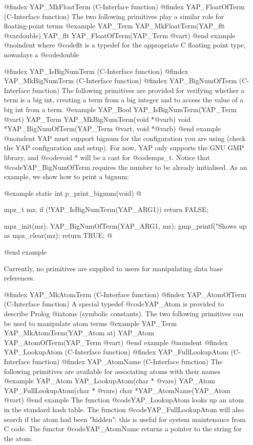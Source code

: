 {{{{{{{{@findex YAP_MkFloatTerm (C-Interface function)
@findex YAP_FloatOfTerm (C-Interface function)
The two following primitives play a similar role for floating-point terms
@example
      YAP_Term YAP_MkFloatTerm(YAP_flt @var{double})
      YAP_flt  YAP_FloatOfTerm(YAP_Term @var{t})
@end example
@noindent
where @code{flt} is a typedef for the appropriate C floating point type,
nowadays a @code{double}

@findex YAP_IsBigNumTerm (C-Interface function)
@findex YAP_MkBigNumTerm (C-Interface function)
@findex YAP_BigNumOfTerm (C-Interface function)
The following primitives are provided for verifying whether a term is
a big int, creating a term from a big integer and to access the value
of a big int from a term.
@example
      YAP_Bool YAP_IsBigNumTerm(YAP_Term @var{t})
      YAP_Term YAP_MkBigNumTerm(void  *@var{b})
      void *YAP_BigNumOfTerm(YAP_Term @var{t}, void *@var{b})
@end example
@noindent
YAP must support bignum for the configuration you are using (check the
YAP configuration and setup). For now, YAP only supports the GNU GMP
library, and @code{void *} will be a cast for @code{mpz_t}. Notice
that @code{YAP_BigNumOfTerm} requires the number to be already
initialised. As an example, we show how to print a bignum:

@example
static int
p_print_bignum(void)
@{
  mpz_t mz;
  if (!YAP_IsBigNumTerm(YAP_ARG1))
    return FALSE;

  mpz_init(mz);
  YAP_BigNumOfTerm(YAP_ARG1, mz);
  gmp_printf("Shows up as %
  mpz_clear(mz);
  return TRUE;
@}
@end example


Currently, no primitives are supplied to users for manipulating data base
references. 

@findex YAP_MkAtomTerm (C-Interface function)
@findex YAP_AtomOfTerm (C-Interface function)
A special typedef @code{YAP_Atom} is provided to describe Prolog
@i{atoms} (symbolic constants). The two following primitives can be used
to manipulate atom terms
@example
      YAP_Term YAP_MkAtomTerm(YAP_Atom at)
      YAP_Atom YAP_AtomOfTerm(YAP_Term @var{t})
@end example
@noindent
@findex YAP_LookupAtom (C-Interface function)
@findex YAP_FullLookupAtom (C-Interface function)
@findex YAP_AtomName (C-Interface function)
The following primitives are available for associating atoms with their
names 
@example
      YAP_Atom  YAP_LookupAtom(char * @var{s})
      YAP_Atom  YAP_FullLookupAtom(char * @var{s})
      char     *YAP_AtomName(YAP_Atom @var{t})
@end example
The function @code{YAP_LookupAtom} looks up an atom in the standard hash
table. The function @code{YAP_FullLookupAtom} will also search if the
atom had been "hidden": this is useful for system maintenance from C
code. The functor @code{YAP_AtomName} returns a pointer to the string
for the atom.

}}}}}}}}

